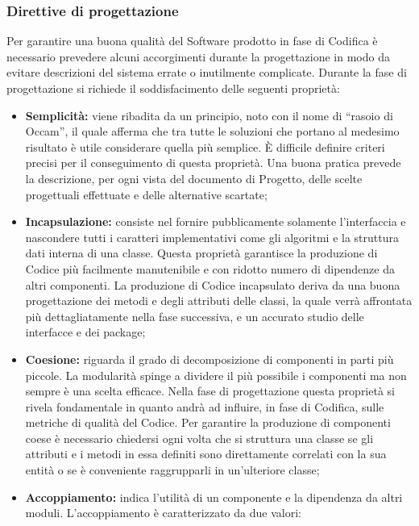     \subsubsection{Direttive di progettazione}
     Per garantire una buona qualità del Software prodotto in fase di Codifica è necessario prevedere alcuni accorgimenti durante la progettazione in modo da evitare descrizioni del sistema errate o inutilmente complicate. Durante la fase di progettazione si richiede il soddisfacimento delle seguenti proprietà:
     \begin{itemize}
     
     
     \item \textbf{Semplicità:} viene ribadita da un principio, noto con il nome di “rasoio di Occam”, il quale afferma che tra tutte le soluzioni che portano al medesimo risultato è utile considerare quella più semplice. È difficile definire criteri precisi per il conseguimento di questa proprietà. Una buona pratica prevede la  descrizione, per ogni vista del documento di Progetto, delle scelte progettuali
     effettuate e delle alternative scartate;
     \item \textbf{Incapsulazione:} consiste nel fornire pubblicamente solamente l’interfaccia e  nascondere tutti i caratteri implementativi come gli algoritmi e la struttura  dati interna di una classe. Questa proprietà garantisce la produzione di Codice più facilmente manutenibile e con ridotto numero di dipendenze da altri componenti. La produzione di Codice incapsulato deriva da una buona progettazione dei metodi e degli attributi delle classi, la quale verrà affrontata più dettagliatamente nella fase successiva, e un accurato studio delle interfacce e dei package;
     \item \textbf{Coesione:} riguarda il grado di decomposizione di componenti in parti più piccole. La modularità spinge a dividere il più possibile i componenti ma non sempre è una scelta efficace. Nella fase di progettazione questa proprietà si rivela fondamentale in quanto andrà ad influire, in fase di Codifica, sulle metriche di  qualità del Codice. Per garantire la produzione di componenti coese è necessario chiedersi ogni volta che si struttura una classe se gli attributi e i metodi in essa definiti sono direttamente correlati con la sua entità o se è conveniente raggrupparli in un’ulteriore classe;
     \item \textbf{Accoppiamento:} indica l’utilità di un componente e la dipendenza da altri moduli. L’accoppiamento è caratterizzato da due valori:
     \begin{itemize}


\end{itemize}
\end{itemize}
